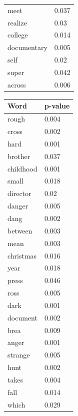 \documentclass[12pt, oneside]{article}   	%
\begin{document}
\begin{table}[H]
\begin{tabular}[t]{l|l}
meet        & 0.037    \\
realize     & 0.03     \\
college     & 0.014    \\
documentary & 0.005    \\
self        & 0.02     \\
super       & 0.042    \\
across      & 0.006    \\
\end{tabular}
\begin{tabular}[t]{l|l}
\textbf{Word}        & \textbf{p-value} \\ \hline
rough       & 0.004    \\
cross       & 0.002    \\
hard        & 0.001    \\
brother     & 0.037    \\
childhood   & 0.001    \\
small       & 0.018    \\
director    & 0.02     \\
danger      & 0.005    \\
dang        & 0.002    \\
between     & 0.003    \\
mean        & 0.003    \\
christmas   & 0.016    \\
year        & 0.018    \\
press       & 0.046    \\
ross        & 0.005    \\
dark        & 0.001    \\
document    & 0.002    \\
brea        & 0.009    \\
anger       & 0.001    \\
strange     & 0.005    \\
hunt        & 0.002    \\
takes       & 0.004    \\
fall        & 0.014    \\
which       & 0.029    \\

\end{tabular}
\end{table}
\end{document}
